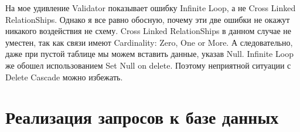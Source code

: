 На мое удивление Validator показывает ошибку Infinite Loop, а не Cross Linked RelationShips.
Однако я все равно обосную, почему эти две ошибки не окажут никакого воздействия не схему.
Cross Linked RelationShips в данном случае не уместен, так как связи имеют Cardinality: Zero, One or More.
А следовательно, даже при пустой таблице мы можем вставить данные, указав Null.
Infinite Loop же обошел использованием Set Null on delete.
Поэтому неприятной ситуации с Delete Cascade можно избежать.

\section {Реализация запросов к базе данных}

